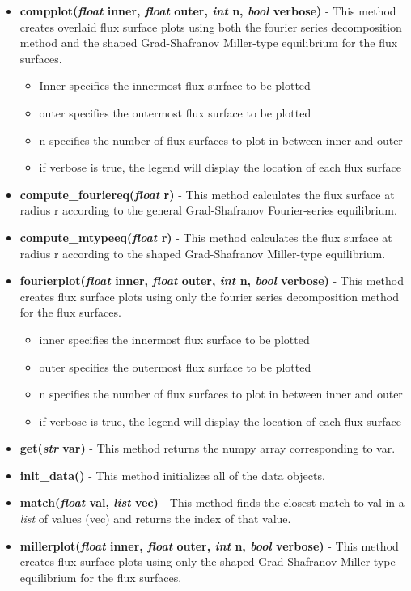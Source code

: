 \documentclass{article}
\begin{document}
\begin{itemize}
\begin{itemize}
\item \textbf{compplot(\emph{float} inner, \emph{float} outer, \emph{int} n, \emph{bool} verbose)} - This method creates overlaid flux surface plots using both the fourier series decomposition method and the shaped Grad-Shafranov Miller-type equilibrium for the flux surfaces.
\begin{itemize}
\item Inner specifies the innermost flux surface to be plotted
\item outer specifies the outermost flux surface to be plotted
\item n specifies the number of flux surfaces to plot in between inner and outer
\item if verbose is true, the legend will display the location of each flux surface
\end{itemize}
\item \textbf{compute\_fouriereq(\emph{float} r)} - This method calculates the flux surface at radius r according to the general Grad-Shafranov Fourier-series equilibrium.
\item \textbf{compute\_mtypeeq(\emph{float} r)} - This method calculates the flux surface at radius r according to the shaped Grad-Shafranov Miller-type equilibrium.
\item \textbf{fourierplot(\emph{float} inner, \emph{float} outer, \emph{int} n, \emph{bool} verbose)} - This method creates flux surface plots using only the fourier series decomposition method for the flux surfaces.
\begin{itemize}
\item inner specifies the innermost flux surface to be plotted
\item outer specifies the outermost flux surface to be plotted
\item n specifies the number of flux surfaces to plot in between inner and outer
\item if verbose is true, the legend will display the location of each flux surface
\end{itemize}
\item \textbf{get(\emph{str} var)} - This method returns the numpy array corresponding to var.
\item \textbf{init\_data()} - This method initializes all of the data objects.
\item \textbf{match(\emph{float} val, \emph{list} vec)} - This method finds the closest match to val in a \emph{list} of values (vec) and returns the index of that value.
\item \textbf{millerplot(\emph{float} inner, \emph{float} outer, \emph{int} n, \emph{bool} verbose)} - This method creates flux surface plots using only the shaped Grad-Shafranov Miller-type equilibrium for the flux surfaces.

\end{itemize}
\end{itemize}
\end{document}
